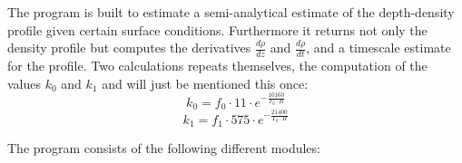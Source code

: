 \documentclass[../../CompleteThesis/Complete_1stDraft.tex]{subfiles}
\begin{document}
The program is built to estimate a semi-analytical estimate of the depth-density profile given certain surface conditions. Furthermore it returns not only the density profile but computes the derivatives $\frac{d\rho}{dz}$ and $\frac{d\rho}{dt}$, and a timescale estimate for the profile. Two calculations repeats themselves, the computation of the values $k_0$ and $k_1$ and will just be mentioned this once:
\begin{equation}
	k_0 = f_0\cdot 11\cdot e^{-\frac{10160}{T_0\cdot R}}
	\label{Eq:k0}
\end{equation}
\begin{equation}
	k_1 = f_1\cdot 575\cdot e^{-\frac{21400}{T_0\cdot R}}
	\label{Eq:k1}
\end{equation}

The program consists of the following different modules:
\end{document}
